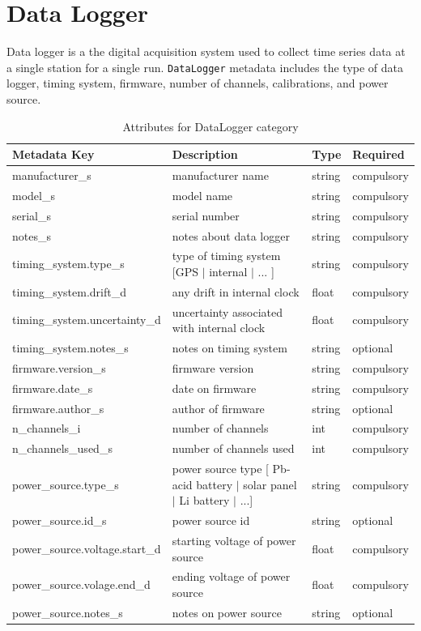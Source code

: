 \documentclass{article}
\begin{document}
\newpage
\section{Data Logger}

Data logger is a the digital acquisition system used to collect time series data at a single station for a single run.  \verb|DataLogger| metadata includes the type of data logger, timing system, firmware, number of channels, calibrations, and power source.

\begin{table}[htb!]
	\caption[Attributes for DataLogger]{Attributes for DataLogger category}
	\begin{tabular}{|l|p{3in}|l|l|}
		\hline
		\textbf{Metadata Key} & \textbf{Description} & \textbf{Type} & \textbf{Required} \\ \hline
		manufacturer\_s & manufacturer name & string & compulsory \\ \hline
		model\_s & model name & string & compulsory \\ \hline
		serial\_s & serial number & string & compulsory \\ \hline
		notes\_s & notes about data logger & string & compulsory \\ \hline
		timing\_system.type\_s & type of timing system [GPS $|$ internal $|$ ... ] & string & compulsory \\ \hline
		timing\_system.drift\_d & any drift in internal clock & float & compulsory \\ \hline
		timing\_system.uncertainty\_d & uncertainty associated with internal clock & float & compulsory \\ \hline
		timing\_system.notes\_s & notes on timing system & string & optional \\ \hline
		firmware.version\_s & firmware version & string & compulsory \\ \hline
		firmware.date\_s & date on firmware & string & compulsory \\ \hline
		firmware.author\_s & author of firmware & string & optional \\ \hline
		n\_channels\_i & number of channels & int & compulsory \\ \hline
		n\_channels\_used\_s & number of channels used & int & compulsory \\ \hline
		power\_source.type\_s & power source type [ Pb-acid battery $|$ solar panel $|$ Li battery $|$ ...] & string & compulsory \\ \hline
		power\_source.id\_s & power source id & string & optional \\ \hline
		power\_source.voltage.start\_d & starting voltage of power source & float & compulsory \\ \hline
		power\_source.volage.end\_d & ending voltage of power source & float & compulsory \\ \hline
		power\_source.notes\_s & notes on power source & string & optional \\ \hline
	\end{tabular}
	\label{tab:datalogger}
\end{table}	
\end{document}
